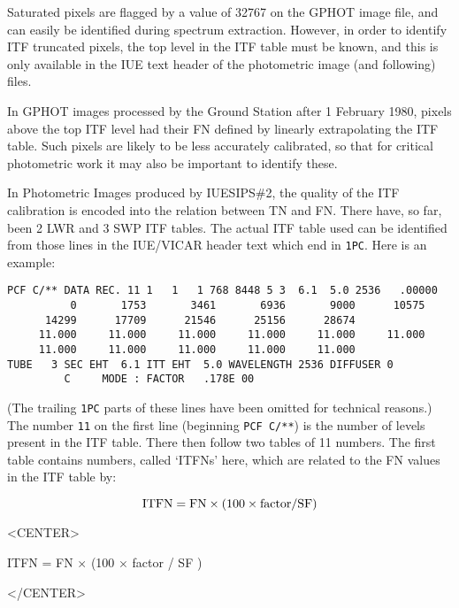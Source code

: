 Saturated pixels are flagged by a value of 32767 on the GPHOT image file,
and can easily be identified during spectrum extraction.  However, in order to
identify ITF truncated pixels, the top level in the ITF table must be
known, and this is only available in the IUE text header of the photometric
image (and following) files.

In GPHOT images processed by the Ground Station after 1 February 1980, pixels
above the top ITF level had their FN defined by linearly extrapolating the ITF
table.  Such pixels are likely to be less accurately calibrated, so
that for critical photometric work it may also be important to identify these.

In Photometric Images produced by IUESIPS\#2, the quality of the ITF
calibration is encoded into the relation between TN and FN\@.  There have, so
far, been 2 LWR and 3 SWP ITF tables.  The actual ITF table used can be
identified from those lines in the IUE/VICAR header text which end in
\verb+1PC+\@.  Here is an example:

\begin{verbatim}
PCF C/** DATA REC. 11 1   1   1 768 8448 5 3  6.1  5.0 2536   .00000
          0       1753       3461       6936       9000      10575
      14299      17709      21546      25156      28674
     11.000     11.000     11.000     11.000     11.000     11.000
     11.000     11.000     11.000     11.000     11.000
TUBE   3 SEC EHT  6.1 ITT EHT  5.0 WAVELENGTH 2536 DIFFUSER 0
         C     MODE : FACTOR   .178E 00
\end{verbatim}

(The trailing \verb+1PC+ parts of these lines have been omitted for
technical reasons.\@)  The number \verb+11+ on the first line (beginning
\verb+PCF C/**+) is the number of levels present in the ITF table.  There then
follow two tables of 11 numbers.  The first table contains numbers, called
`ITFNs' here, which are related to the FN values in the ITF table by:

\begin{latexonly}
\begin{displaymath}
{\rm ITFN} = {\rm FN} \times (100 \times {\rm factor} / {\rm SF})
\end{displaymath}
\end{latexonly}

\begin{htmlonly}
\begin{rawhtml}
<CENTER>
\end{rawhtml}
ITFN = FN $\times$ (100 $\times$ factor / SF )
\begin{rawhtml}
</CENTER>
\end{rawhtml}
\end{htmlonly}


